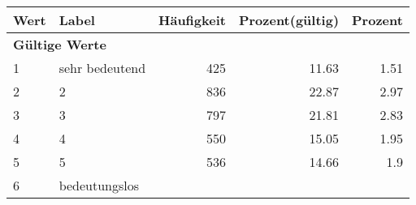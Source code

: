      \begin{longtable}{lXrrr}
     \toprule
     \textbf{Wert} & \textbf{Label} & \textbf{Häufigkeit} & \textbf{Prozent(gültig)} & \textbf{Prozent} \\
     \endhead
     \midrule
     \multicolumn{5}{l}{\textbf{Gültige Werte}}\\

     1 &
     \multicolumn{1}{X}{ sehr bedeutend   } &


       \num{425} &
       \num[round-mode=places,round-precision=2]{11.63} &
         \num[round-mode=places,round-precision=2]{1.51} \\

     2 &
     \multicolumn{1}{X}{ 2   } &


       \num{836} &
       \num[round-mode=places,round-precision=2]{22.87} &
         \num[round-mode=places,round-precision=2]{2.97} \\

     3 &
     \multicolumn{1}{X}{ 3   } &


       \num{797} &
       \num[round-mode=places,round-precision=2]{21.81} &
         \num[round-mode=places,round-precision=2]{2.83} \\

     4 &
     \multicolumn{1}{X}{ 4   } &


       \num{550} &
       \num[round-mode=places,round-precision=2]{15.05} &
         \num[round-mode=places,round-precision=2]{1.95} \\

     5 &
     \multicolumn{1}{X}{ 5   } &


       \num{536} &
       \num[round-mode=places,round-precision=2]{14.66} &
         \num[round-mode=places,round-precision=2]{1.9} \\

     6 &
     \multicolumn{1}{X}{ bedeutungslos   } &



\end{longtable}

